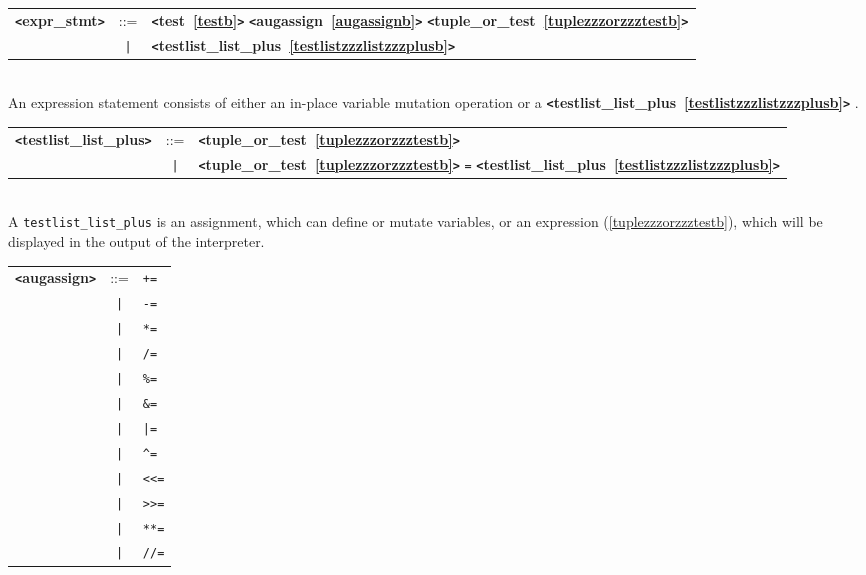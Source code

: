 \documentclass[12pt]{article}
\begin{document}
\label{exprzzzstmtb}
\begin{tabular}{lcl}
{\bf \verb+<+expr\_stmt\verb+>+} & ::=  & {\bf \verb+<+test~\ref{testb}\verb+>+}  {\bf \verb+<+augassign~\ref{augassignb}\verb+>+}  {\bf \verb+<+tuple\_or\_test~\ref{tuplezzzorzzztestb}\verb+>+}  \\
 & \verb+|+  & {\bf \verb+<+testlist\_list\_plus~\ref{testlistzzzlistzzzplusb}\verb+>+}  \\
\end{tabular} \\

An expression statement consists of either an in-place variable mutation operation or a {\bf \verb+<+testlist\_list\_plus~\ref{testlistzzzlistzzzplusb}\verb+>+} .

\label{testlistzzzlistzzzplusb}
\begin{tabular}{lcl}
{\bf \verb+<+testlist\_list\_plus\verb+>+} & ::=  & {\bf \verb+<+tuple\_or\_test~\ref{tuplezzzorzzztestb}\verb+>+}  \\
 & \verb+|+  & {\bf \verb+<+tuple\_or\_test~\ref{tuplezzzorzzztestb}\verb+>+}  \verb|=| {\bf \verb+<+testlist\_list\_plus~\ref{testlistzzzlistzzzplusb}\verb+>+}  \\
\end{tabular} \\

A \verb|testlist_list_plus| is an assignment, which can define or mutate variables, or an expression (\ref{tuplezzzorzzztestb}), which will be displayed in the output of the interpreter.

\label{augassignb}
\begin{tabular}{lcl}
{\bf \verb+<+augassign\verb+>+} & ::=  & \verb|+=| \\
 & \verb+|+  & \verb|-=| \\
 & \verb+|+  & \verb|*=| \\
 & \verb+|+  & \verb|/=| \\
 & \verb+|+  & \verb|%=| \\
 & \verb+|+  & \verb|&=| \\
 & \verb+|+  & \verb+|=+ \\
 & \verb+|+  & \verb|^=| \\
 & \verb+|+  & \verb|<<=| \\
 & \verb+|+  & \verb|>>=| \\
 & \verb+|+  & \verb|**=| \\
 & \verb+|+  & \verb|//=| \\
\end{tabular}
\end{document}
